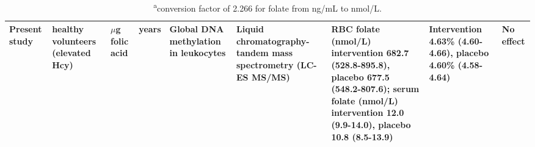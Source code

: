 \begin{sidewaystable}[hp!]
\begin{tabular}{L{1.3cm}C{1.5cm}C{1.5cm}C{1.2cm}C{1.4cm}C{1.5cm}C{2cm}C{2cm}C{1.8cm}}
\parbox[t][4.1cm]{1.3cm}{\raggedright Present study} &
\parbox[t][4.1cm]{1.5cm}{ healthy volunteers (elevated Hcy)} &
\parbox[t][4.1cm]{1.5cm}{ $\mu$g folic acid} &
\parbox[t][4.1cm]{1.2cm}{ years} &
\parbox[t][4.1cm]{1.4cm}{\centering Global DNA methylation in leukocytes} &
\parbox[t][4.1cm]{1.5cm}{\centering Liquid chromatography-tandem mass spectrometry (LC-ES MS/MS)} &
\parbox[t][4.1cm]{2cm}{\centering RBC folate (nmol/L) intervention 682.7 (528.8-895.8), placebo 677.5 (548.2-807.6); serum folate (nmol/L) intervention 12.0 (9.9-14.0), placebo 10.8 (8.5-13.9)} &
\parbox[t][4.1cm]{2.0cm}{\centering Intervention 4.63\% (4.60-4.66), placebo 4.60\% (4.58-4.64)} &
\parbox[t][4.1cm]{1.8cm}{\centering No effect}\\
\hline
\end{tabular}
\caption*{\footnotesize{\textsuperscript{a}conversion factor of 2.266 for folate from ng/mL to nmol/L.}}
\end{sidewaystable}
